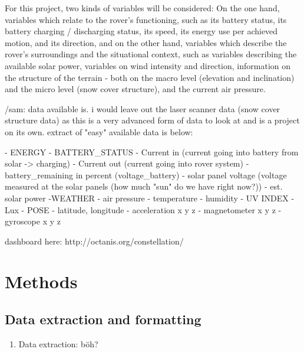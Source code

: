 \documentclass[11pt, UKenglish]{report}
\begin{document}
{For this project, two kinds of variables will be considered: On the one hand, variables which relate to the rover's functioning, such as its battery status, its battery charging / discharging status, its speed, its energy use per achieved motion, and its direction, and on the other hand, variables which describe the rover's surroundings and the situational context, such as variables describing the available solar power, variables on wind intensity and direction, information on the structure of the terrain - both on the macro level (elevation and inclination) and the micro level (snow cover structure), and the current air pressure.

/sam:  data available is. i would leave out the laser scanner data (snow cover structure data) as this is a very advanced form of data to look at and is a project on its own. extract of "easy" available data is below:

- ENERGY
	- BATTERY_STATUS
		- Current in (current going into battery from solar -> charging)
		- Current out (current going into rover system)
		- battery_remaining in percent (voltage_battery)
		- solar panel voltage (voltage measured at the solar panels (how much "sun" do we have right now?))
		- est. solar power
-WEATHER
		 - air pressure
		 - temperature
		 - humidity
		- UV INDEX
		- Lux
- POSE
	- latitude, longitude
	- acceleration x y z
	- magnetometer x y z
	- gyroscope x y z

dashboard here:
http://octanis.org/constellation/





\section*{Methods}

\subsection*{Data extraction and formatting}

\begin{enumerate}

	\item{\large{Data extraction:} \normalsize böh? }


\end{enumerate}}
\end{document}
